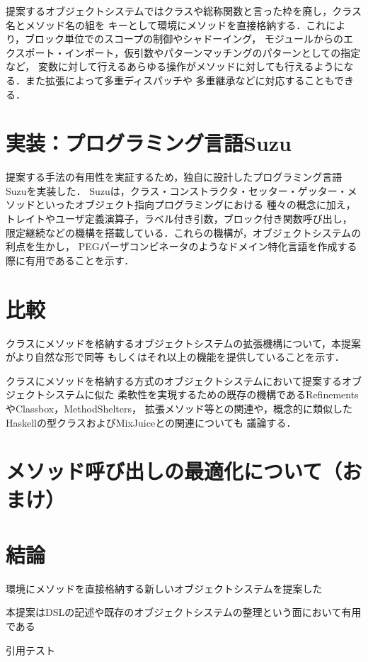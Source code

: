 \documentclass{ipsjprosym}
\begin{document}
提案するオブジェクトシステムではクラスや総称関数と言った枠を廃し，クラス名とメソッド名の組を
キーとして環境にメソッドを直接格納する．これにより，ブロック単位でのスコープの制御やシャドーイング，
モジュールからのエクスポート・インポート，仮引数やパターンマッチングのパターンとしての指定など，
変数に対して行えるあらゆる操作がメソッドに対しても行えるようになる．また拡張によって多重ディスパッチや
多重継承などに対応することもできる．

\section{実装：プログラミング言語Suzu}

提案する手法の有用性を実証するため，独自に設計したプログラミング言語Suzuを実装した．
Suzuは，クラス・コンストラクタ・セッター・ゲッター・メソッドといったオブジェクト指向プログラミングにおける
種々の概念に加え，トレイトやユーザ定義演算子，ラベル付き引数，ブロック付き関数呼び出し，
限定継続などの機構を搭載している．これらの機構が，オブジェクトシステムの利点を生かし，
PEGパーザコンビネータのようなドメイン特化言語を作成する際に有用であることを示す．

\section{比較}

クラスにメソッドを格納するオブジェクトシステムの拡張機構について，本提案がより自然な形で同等
もしくはそれ以上の機能を提供していることを示す．

クラスにメソッドを格納する方式のオブジェクトシステムにおいて提案するオブジェクトシステムに似た
柔軟性を実現するための既存の機構であるRefinementsやClassbox，MethodShelters，
拡張メソッド等との関連や，概念的に類似したHaskellの型クラスおよびMixJuiceとの関連についても
議論する．

\section{メソッド呼び出しの最適化について（おまけ）}



\section{結論}

環境にメソッドを直接格納する新しいオブジェクトシステムを提案した

本提案はDSLの記述や既存のオブジェクトシステムの整理という面において有用である

引用テスト





\end{document}
